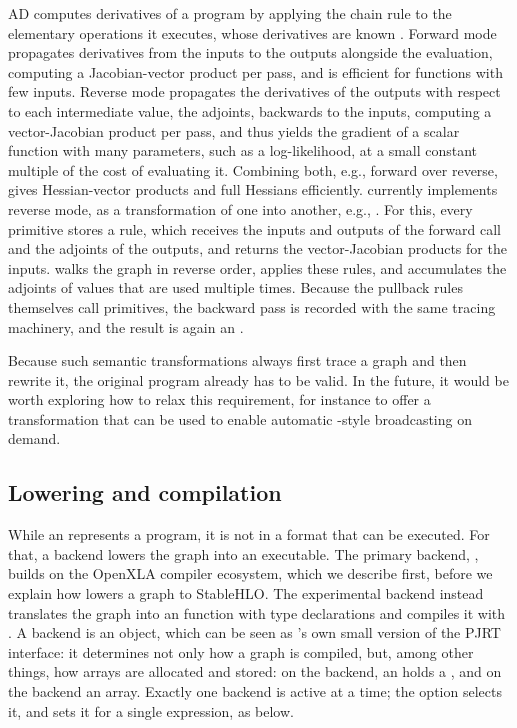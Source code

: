 \documentclass[article,shortnames]{jss}
\begin{document}
AD computes derivatives of a program by applying the chain rule to the elementary operations it executes, whose derivatives are known \citep{ref-griewank2008evaluating}.
Forward mode propagates derivatives from the inputs to the outputs alongside the evaluation, computing a Jacobian-vector product per pass, and is efficient for functions with few inputs.
Reverse mode propagates the derivatives of the outputs with respect to each intermediate value, the adjoints, backwards to the inputs, computing a vector-Jacobian product per pass, and thus yields the gradient of a scalar function with many parameters, such as a log-likelihood, at a small constant multiple of the cost of evaluating it.
Combining both, e.g., forward over reverse, gives Hessian-vector products and full Hessians efficiently.
 currently implements reverse mode, as a transformation of one  into another, e.g., .
For this, every primitive stores a  rule, which receives the inputs and outputs of the forward call and the adjoints of the outputs, and returns the vector-Jacobian products for the inputs.
 walks the graph in reverse order, applies these rules, and accumulates the adjoints of values that are used multiple times.
Because the pullback rules themselves call primitives, the backward pass is recorded with the same tracing machinery, and the result is again an .

Because such semantic transformations always first trace a graph and then rewrite it, the original program already has to be valid.
In the future, it would be worth exploring how to relax this requirement, for instance to offer a  transformation that can be used to enable automatic -style broadcasting on demand.

\subsection{Lowering and compilation}\label{lowering}

While an  represents a program, it is not in a format that can be executed.
For that, a backend lowers the graph into an executable.
The primary backend, , builds on the OpenXLA compiler ecosystem, which we describe first, before we explain how  lowers a graph to StableHLO.
The experimental  backend instead translates the graph into an  function with type declarations and compiles it with .
A backend is an  object, which can be seen as 's own small version of the PJRT interface: it determines not only how a graph is compiled, but, among other things, how arrays are allocated and stored: on the  backend, an  holds a , and on the  backend an  array.
Exactly one backend is active at a time; the option  selects it, and  sets it for a single expression, as below.
\end{document}
